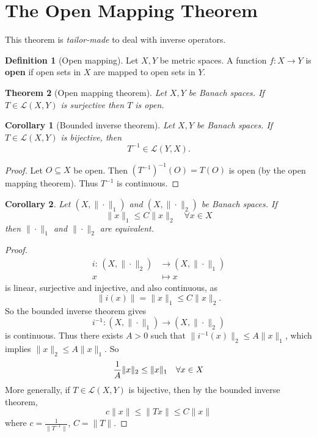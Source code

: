 \documentclass[10pt, oneside, reqno]{amsbook}
\theoremstyle{plain}%
\newtheorem{thm}{Theorem}[section]
\newtheorem*{cor}{Corollary}
\theoremstyle{definition}
\newtheorem{defn}[thm]{Definition}
\theoremstyle{remark}
\newcommand{\mapping}[5]{\begin{align*}
    #1 : \,     #2 &\rightarrow #3 \\
            #4  &\mapsto #5
\end{align*}    
}
\begin{document}
\section{The Open Mapping Theorem}
This theorem is \emph{tailor-made} to deal with inverse operators.

\begin{defn}[Open mapping]
    Let $X, Y$ be metric spaces.  A function $f : X \rightarrow Y$ is \textbf{open} if open sets in $X$ are mapped to open sets in $Y$.  
\end{defn}

\begin{thm}[Open mapping theorem]
    Let $X, Y$ be Banach spaces.  If $T \in \mathcal{L}(X,Y)$ is surjective then $T$ is open. 
\end{thm}

\begin{cor}[Bounded inverse theorem]
    Let $X, Y$ be Banach spaces.  If $T \in \mathcal L(X,Y)$ is bijective, then \[
        T^{-1} \in \mathcal L(Y,X).
    \]
    
\end{cor}
\begin{proof}
    Let $O \subseteq X$ be open.  Then $(T^{-1})^{-1}(O) = T(O)$ is open (by the open mapping theorem).  Thus $T^{-1}$ is continuous.
\end{proof}

\begin{cor}
    Let $(X, \| \cdot \|_1)$ and $(X, \| \cdot \|_2)$ be Banach spaces.  If \[
        \| x \|_1 \leq C \| x \|_2 \quad \forall x \in X
    \] then $\| \cdot \|_1$ and $\| \cdot \|_2$ are equivalent.  
\end{cor}
\begin{proof}
    \mapping{i}{(X, \| \cdot \|_2)}{(X, \| \cdot \|_1)}{ x}{x} is linear, surjective and injective, and also continuous, as \[
        \|i(x) \| = \| x \|_1 \leq C \| x \|_2.
    \]  So the bounded inverse theorem gives \[
        i^{-1} : (X, \| \cdot \|_1) \rightarrow (X, \| \cdot \|_2)
    \] is continuous.  Thus there exists $A > 0$ such that $\| i^{-1}(x)\|_2 \leq A \| x \|_1$, which implies $\| x \|_2 \leq A \| x \|_1$.  So \[
        \frac{1}{A} \| x \|_2 \leq \| x \|_1 \quad \forall x \in X \qedhere
    \]  More generally, if $T \in \mathcal L(X,Y)$ is bijective, then by the bounded inverse theorem, \[
        c \| x \| \leq \| Tx \| \leq C \| x \|
    \] where $c  = \frac{1}{ \| T^{-1} \|}$, $C = \| T \|$.  
\end{proof} 
\end{document}
